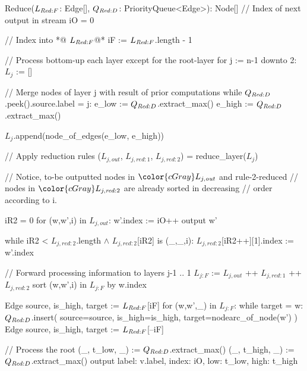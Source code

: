 \begin{blstlisting}
  Reduce($\ReduceLforward$: Edge[], $\ReduceQdep$: PriorityQueue<Edge>): Node[]
    // Index of next output in stream
    iO = 0

    // Index into *@\color{cGray} $\ReduceLforward$@*
    iF := $\ReduceLforward$.length - 1

    // Process bottom-up each layer except for the root-layer
    for j := n-1 downto 2:
      $L_{j}$ := []

      // Merge nodes of layer j with result of prior computations
      while $\ReduceQdep$.peek().source.label = j:
        e_low  := $\ReduceQdep$.extract_max()
        e_high := $\ReduceQdep$.extract_max()

        $L_{j}$.append(node_of_edges(e_low, e_high))

      // Apply reduction rules
      ($L_{j,\mathit{out}}$, $L_{j,\mathit{red:}1}$, $L_{j,\mathit{red:}2}$) = reduce_layer($L_{j}$)

      // Notice, to-be outputted nodes in $\color{cGray}L_{j,\mathit{out}}$ and rule-2-reduced
      // nodes in $\color{cGray}L_{j,\mathit{red:}2}$ are already sorted in decreasing
      // order according to i.

      iR2 = 0
      for (w,w',i) in $L_{j,\mathit{out}}$:
        w'.index := iO++
        output w'

        while iR2 < $L_{j,\mathit{red:}2}$.length $\land$ $L_{j,\mathit{red:}2}$[iR2] is (_,_,i):
          $L_{j,\mathit{red:}2}$[iR2++][1].index := w'.index

      // Forward processing information to layers j-1 .. 1
      $L_{j:F}$ := $L_{j,\mathit{out}}$ ++ $L_{j,\mathit{red:}1}$ ++ $L_{j,\mathit{red:}2}$
      sort (w,w',i) in $L_{j:F}$ by w.index

      Edge{ source, is_high, target } := $\ReduceLforward$[iF]
      for (w,w',_) in $L_{j:F}$:
        while target = w:
          $\ReduceQdep$.insert({
            source=source,
            is_high=is_high,
            target=nodearc_of_node(w')
          })
          Edge{ source, is_high, target } := $\ReduceLforward$[--iF]

    // Process the root
    (_, t_low,  _) := $\ReduceQdep$.extract_max()
    (_, t_high, _) := $\ReduceQdep$.extract_max()
    output { label: v.label, index: iO, low: t_low, high: t_high }
\end{blstlisting}
